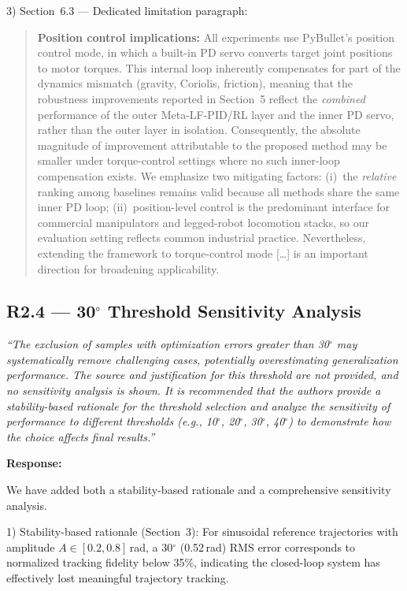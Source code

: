 \documentclass[11pt,a4paper]{article}
\newcommand{\reviewercomment}[1]{\medskip\noindent\textit{``#1''}\medskip}
\newcommand{\response}{\noindent\textbf{Response:}\par\noindent}
\begin{document}
3) Section~6.3 --- Dedicated limitation paragraph:
\begin{quote}\color{blue}\small
\textbf{Position control implications:} All experiments use PyBullet's position control mode, in which a built-in PD servo converts target joint positions to motor torques. This internal loop inherently compensates for part of the dynamics mismatch (gravity, Coriolis, friction), meaning that the robustness improvements reported in Section~5 reflect the \textit{combined} performance of the outer Meta-LF-PID/RL layer and the inner PD servo, rather than the outer layer in isolation. Consequently, the absolute magnitude of improvement attributable to the proposed method may be smaller under torque-control settings where no such inner-loop compensation exists. We emphasize two mitigating factors: (i)~the \textit{relative} ranking among baselines remains valid because all methods share the same inner PD loop; (ii)~position-level control is the predominant interface for commercial manipulators and legged-robot locomotion stacks, so our evaluation setting reflects common industrial practice. Nevertheless, extending the framework to torque-control mode [\ldots] is an important direction for broadening applicability.
\end{quote}

\subsection*{R2.4 --- 30$^\circ$ Threshold Sensitivity Analysis}

\reviewercomment{The exclusion of samples with optimization errors greater than 30$^\circ$ may systematically remove challenging cases, potentially overestimating generalization performance. The source and justification for this threshold are not provided, and no sensitivity analysis is shown. It is recommended that the authors provide a stability-based rationale for the threshold selection and analyze the sensitivity of performance to different thresholds (e.g., 10$^\circ$, 20$^\circ$, 30$^\circ$, 40$^\circ$) to demonstrate how the choice affects final results.}

\response
We have added both a stability-based rationale and a comprehensive sensitivity analysis.

1) Stability-based rationale (Section~3): For sinusoidal reference trajectories with amplitude $A \in [0.2, 0.8]$\,rad, a 30$^\circ$ (0.52\,rad) RMS error corresponds to normalized tracking fidelity below 35\%, indicating the closed-loop system has effectively lost meaningful trajectory tracking.
\end{document}
